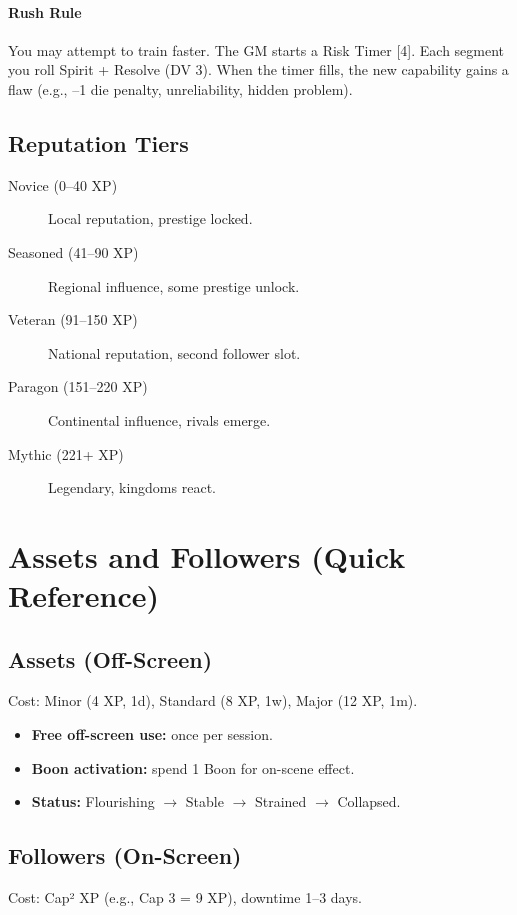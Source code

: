 \paragraph{Rush Rule}
You may attempt to train faster. The GM starts a Risk Timer [4]. Each segment
you roll Spirit + Resolve (DV 3). When the timer fills, the new capability gains
a flaw (e.g., --1 die penalty, unreliability, hidden problem).

\subsection{Reputation Tiers}
\begin{description}
    \item[Novice (0--40 XP)] Local reputation, prestige locked.
    \item[Seasoned (41--90 XP)] Regional influence, some prestige unlock.
    \item[Veteran (91--150 XP)] National reputation, second follower slot.
    \item[Paragon (151--220 XP)] Continental influence, rivals emerge.
    \item[Mythic (221+ XP)] Legendary, kingdoms react.
\end{description}

\section{Assets and Followers (Quick Reference)}\label{sec:assets_followers}

\subsection{Assets (Off-Screen)}
Cost: Minor (4 XP, 1d), Standard (8 XP, 1w), Major (12 XP, 1m).

\begin{itemize}
    \item \textbf{Free off-screen use:} once per session.
    \item \textbf{Boon activation:} spend 1 Boon for on-scene effect.
    \item \textbf{Status:} Flourishing $\rightarrow$ Stable $\rightarrow$ Strained $\rightarrow$ Collapsed.
\end{itemize}

\subsection{Followers (On-Screen)}
Cost: Cap² XP (e.g., Cap 3 = 9 XP), downtime 1--3 days.

